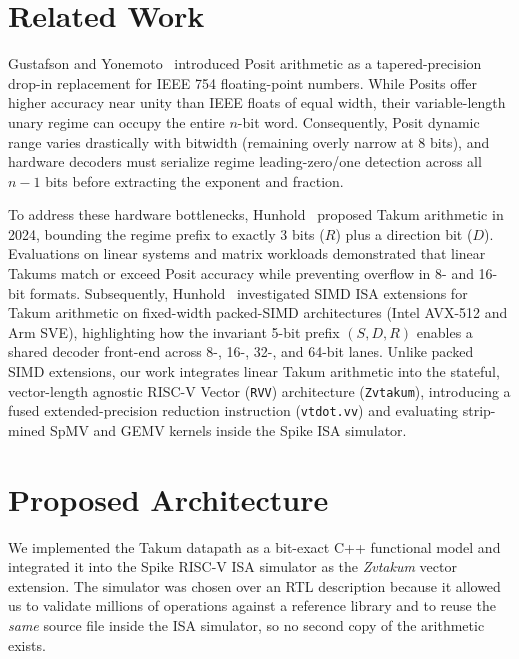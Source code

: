 \documentclass[conference]{IEEEtran}
\begin{document}
\section{Related Work}
\label{sec:related}

Gustafson and Yonemoto~\cite{gustafson2017posit} introduced Posit arithmetic as a tapered-precision drop-in replacement for IEEE 754 floating-point numbers. While Posits offer higher accuracy near unity than IEEE floats of equal width, their variable-length unary regime can occupy the entire $n$-bit word. Consequently, Posit dynamic range varies drastically with bitwidth (remaining overly narrow at 8 bits), and hardware decoders must serialize regime leading-zero/one detection across all $n - 1$ bits before extracting the exponent and fraction.

To address these hardware bottlenecks, Hunhold~\cite{hunhold2024takum} proposed Takum arithmetic in 2024, bounding the regime prefix to exactly 3 bits ($R$) plus a direction bit ($D$). Evaluations on linear systems and matrix workloads demonstrated that linear Takums match or exceed Posit accuracy while preventing overflow in 8- and 16-bit formats. Subsequently, Hunhold~\cite{hunhold2025avx} investigated SIMD ISA extensions for Takum arithmetic on fixed-width packed-SIMD architectures (Intel AVX-512 and Arm SVE), highlighting how the invariant 5-bit prefix $(S, D, R)$ enables a shared decoder front-end across 8-, 16-, 32-, and 64-bit lanes. Unlike packed SIMD extensions, our work integrates linear Takum arithmetic into the stateful, vector-length agnostic RISC-V Vector (\texttt{RVV}) architecture (\texttt{Zvtakum}), introducing a fused extended-precision reduction instruction (\texttt{vtdot.vv}) and evaluating strip-mined SpMV and GEMV kernels inside the Spike ISA simulator.

\section{Proposed Architecture}
\label{sec:arch}

We implemented the Takum datapath as a bit-exact C++ functional model and integrated
it into the Spike RISC-V ISA simulator as the \emph{Zvtakum} vector extension. The
simulator was chosen over an RTL description because it allowed us to validate
millions of operations against a reference library and to reuse the \emph{same} source
file inside the ISA simulator, so no second copy of the arithmetic exists.
\end{document}
